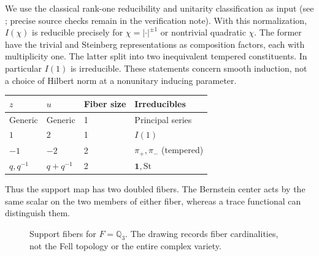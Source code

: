We use the classical rank-one reducibility and unitarity classification as input (see \cite{SS68,Ta92}; precise source checks remain in the verification note). With this normalization, $I(\chi)$ is reducible precisely for $\chi=|\cdot|^{\pm1}$ or nontrivial quadratic $\chi$. The former have the trivial and Steinberg representations as composition factors, each with multiplicity one. The latter split into two inequivalent tempered constituents. In particular $I(1)$ is irreducible. These statements concern smooth induction, not a choice of Hilbert norm at a nonunitary inducing parameter.
\begin{center}\small
\begin{tabularx}{\linewidth}{@{}lllX@{}}\toprule
$z$ & $u$ & Fiber size & Irreducibles\\\midrule
Generic & Generic & 1 & Principal series\\
$1$ & $2$ & 1 & $I(1)$\\
$-1$ & $-2$ & 2 & $\pi_+,\pi_-$ (tempered)\\
$q,q^{-1}$ & $q+q^{-1}$ & 2 & $\mathbf 1,\mathrm{St}$\\\bottomrule
\end{tabularx}\end{center}
Thus the support map has two doubled fibers. The Bernstein center acts by the same scalar on the two members of either fiber, whereas a trace functional can distinguish them.
\begin{figure}[htbp]\centering
{}
\caption{Support fibers for $F=\mathbb Q_3$. The drawing records fiber cardinalities, not the Fell topology or the entire complex variety.}\label{fig:bernstein-fibers}
\end{figure}

